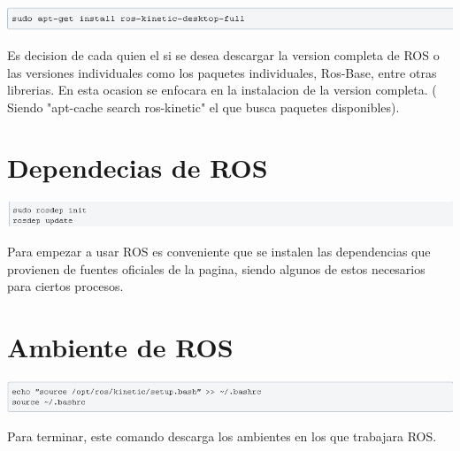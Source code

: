 \documentclass[11pt,a4paper]{article}
\begin{document}
\includegraphics[scale=0.8]{EV1/4.png}

Es decision de cada quien el si se desea descargar la version completa de ROS o las versiones individuales como los paquetes individuales, Ros-Base, entre otras librerias. En esta ocasion se enfocara en la instalacion de la version completa. ( Siendo "apt-cache search ros-kinetic" el que busca paquetes disponibles).

\section{Dependecias de ROS}

\includegraphics[scale=0.8]{EV1/5.png}

Para empezar a usar ROS es conveniente que se instalen las dependencias que provienen de fuentes oficiales de la pagina, siendo algunos de estos necesarios para ciertos procesos. 

\section{Ambiente de ROS}

\includegraphics[scale=0.8]{EV1/6.png}

Para terminar, este comando descarga los ambientes en los que trabajara ROS.
\end{document}
